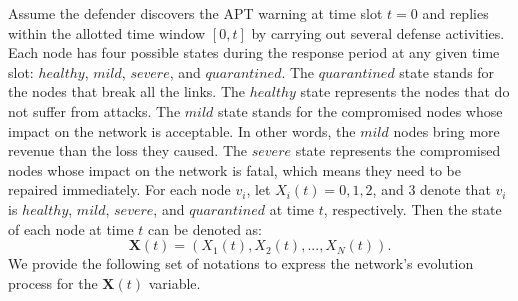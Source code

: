 \documentclass[lettersize,journal]{IEEEtran}
\begin{document}
 Assume the defender discovers the APT warning at time slot $t=0$ and replies within the allotted time window $[0, t]$ by carrying out several defense activities. Each node has four possible states during the response period at any given time slot: $healthy$, $mild$, $severe$, and $quarantined$. The $quarantined$ state stands for the nodes that break all the links. The $healthy$ state represents the nodes that do not suffer from attacks. The $mild$ state stands for the compromised nodes whose impact on the network is acceptable. In other words, the $mild$ nodes bring more revenue than the loss they caused. The $severe$ state represents the compromised nodes whose impact on the network is fatal, which means they need to be repaired immediately. For each node $v_i$, let $X_i(t)=0,1,2$, and $3$ denote that $v_i$ is $healthy$, $mild$, $severe$, and $quarantined$ at time $t$, respectively. Then the state of each node at time $t$ can be denoted as:
\begin{equation}
\label{eq_X}
\mathbf{X}(t)=(X_1(t),X_2(t),...,X_N(t)).
\end{equation}
We provide the following set of notations to express the network's evolution process for the $\mathbf{X}(t)$ variable.
\end{document}
